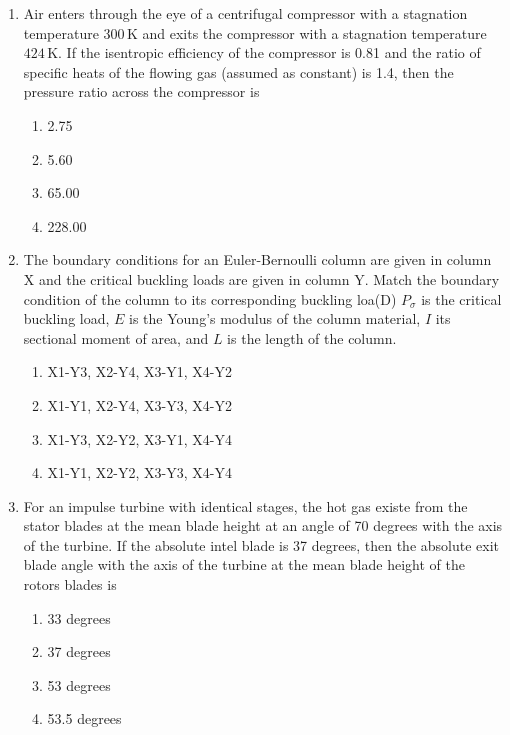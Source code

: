 \documentclass{article}
\begin{document}
\begin{enumerate}
    \item Air enters through the eye of a centrifugal compressor with a stagnation temperature $300 \, \mathrm{K}$ and exits the compressor with a stagnation temperature $424 \, \mathrm{K}$. If the isentropic efficiency of the compressor is 0.81 and the ratio of specific heats of the flowing gas (assumed as constant) is 1.4, then the pressure ratio across the compressor is
    \begin{multicols}{4}
    \begin{enumerate}
        \item 2.75
        \item 5.60
        \item 65.00
        \item 228.00
    \end{enumerate}
    \end{multicols}
        

    \item The boundary conditions for an Euler-Bernoulli column are given in column X and the critical buckling loads are given in column Y. Match the boundary condition of the column to its corresponding buckling loa(D) $P_\sigma$ is the critical buckling load, $E$ is the Young's modulus of the column material, $I$ its sectional moment of area, and $L$ is the length of the column.
    \begin{table}
        
    \end{table}
    \begin{enumerate}
        \item X1-Y3, X2-Y4, X3-Y1, X4-Y2
        \item X1-Y1, X2-Y4, X3-Y3, X4-Y2
        \item X1-Y3, X2-Y2, X3-Y1, X4-Y4
        \item X1-Y1, X2-Y2, X3-Y3, X4-Y4
    \end{enumerate}

    \item For an impulse turbine with identical stages, the hot gas existe from the stator blades at the mean blade height at an angle of 70 degrees with the axis of the turbine. If the absolute intel blade is 37 degrees, then the absolute exit blade angle with the axis of the turbine at the mean blade height of the rotors blades is
    \begin{multicols}{4}
    \begin{enumerate}
        \item 33 degrees
        \item 37 degrees
        \item 53 degrees
        \item 53.5 degrees
    \end{enumerate}
    \end{multicols}


\end{enumerate}
\end{document}
